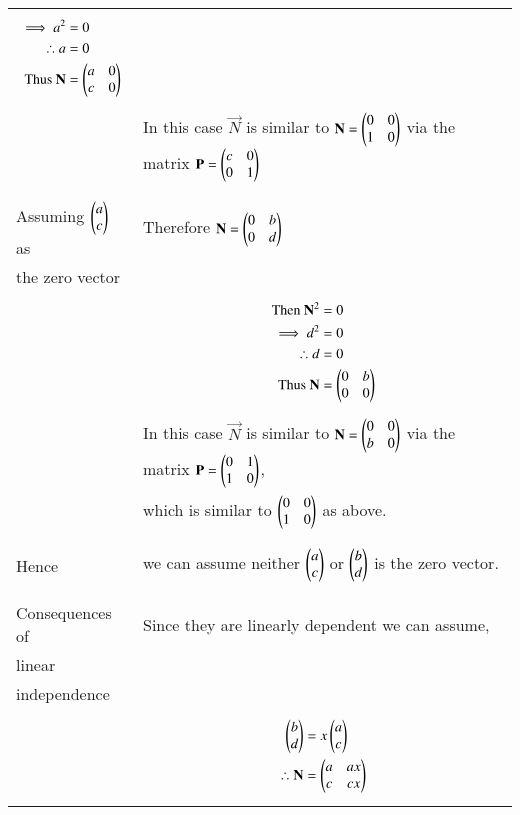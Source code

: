 \documentclass[journal,12pt]{IEEEtran}
\begin{document}
\begin{longtable}{|l|l|}
{\begin{align}
\implies a^2&=0\\
\therefore a&=0\\
\mbox{Thus }\mathbf{N}&=\begin{pmatrix}a&0\\c&0\end{pmatrix}
\end{align}}\\
&In this case $\vec{N}$ is similar to $\mathbf{N}=\begin{pmatrix}0&0\\1&0\end{pmatrix}$ via the matrix $\mathbf{P}=\begin{pmatrix}c&0\\0&1\end{pmatrix}$\\
&\\
\hline
&\\
Assuming $\begin{pmatrix}a\\c\end{pmatrix}$ as&Therefore
$\mathbf{N}=\begin{pmatrix}0&b\\0&d\end{pmatrix}$\\
the zero vector&\\
&\parbox{6cm}{\begin{align}
\mbox{Then }\mathbf{N}^2&=0\\
\implies d^2&=0\\
\therefore d&=0\\
\mbox{Thus }\mathbf{N}&=\begin{pmatrix}0&b\\0&0\end{pmatrix}
\end{align}}\\
&In this case $\vec{N}$ is similar to $\mathbf{N}=\begin{pmatrix}0&0\\b&0\end{pmatrix}$ via the matrix $\mathbf{P}=\begin{pmatrix}0&1\\1&0\end{pmatrix}$,\\
&which is similar to $\begin{pmatrix}0&0\\1&0\end{pmatrix}$ as above.\\
&\\
\hline
&\\
Hence& we can assume neither $\begin{pmatrix}a\\c\end{pmatrix}$ or $\begin{pmatrix}b\\d\end{pmatrix}$ is the zero vector.\\
&\\
\hline
\pagebreak
\hline
&\\
Consequences of &Since they are linearly dependent we can assume,\\
linear&\\
independence&\\
&\parbox{6cm}{\begin{align}
\myvec{b\\d}&=x\myvec{a\\c}\\
\therefore \vec{N}&=\myvec{a&ax\\c&cx}\\

\end{align}}
\end{longtable}
\end{document}
